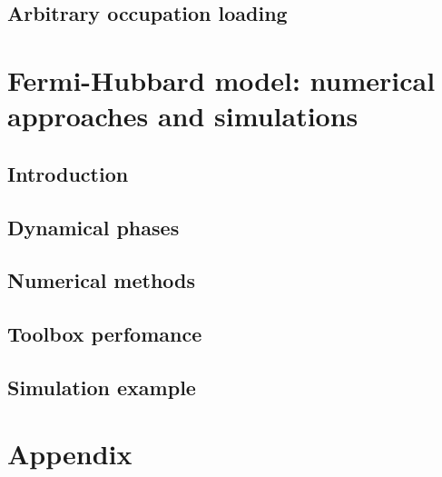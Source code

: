 \documentclass[twoside]{article}
\begin{document}
\subsection{Arbitrary occupation loading} \label{subsec:arbitrary-occupation-loading}



\newpage
\section{Fermi-Hubbard model: numerical approaches and simulations} \label{sec:fhmodel}

\subsection{Introduction}

\subsection{Dynamical phases}

\subsection{Numerical methods}

\subsection{Toolbox perfomance}

\subsection{Simulation example}


\newpage
\section{Appendix} \label{sec:appendix}
\end{document}
